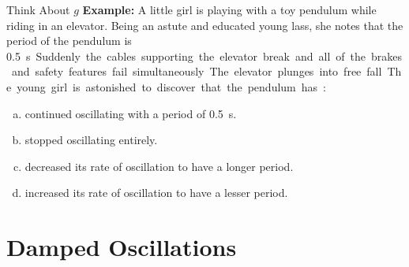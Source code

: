 \documentclass[12pt,compress,aspectratio=169]{beamer}
\begin{document}
\begin{frame}{Think About $g$}
  \textbf{Example:} A little girl is playing with a toy pendulum while riding
  in an elevator. Being an astute and educated young lass, she notes that the 
  period of the pendulum is \SI{.5}\second. Suddenly the cables
  supporting the elevator break and all  of the brakes and safety features fail
  simultaneously. The elevator plunges into free fall. The young girl is
  astonished to discover that the pendulum has:
  \begin{enumerate}[(a)]
  \item continued oscillating with a period of \SI{.5}\second.
  \item stopped oscillating entirely.
  \item decreased its rate of oscillation to have a longer period.
  \item increased its rate of oscillation to have a lesser period.
  \end{enumerate}
\end{frame}



\section{Damped Oscillations}
\end{document}
